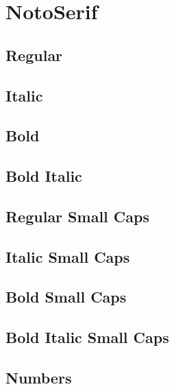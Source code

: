 \documentclass{article}
\begin{document}
\section*{NotoSerif}


\subsection*{Regular}
\lipsum[1]

\subsection*{Italic}
\textit{\lipsum[2]}

\subsection*{Bold}

\textbf{\lipsum[3]}



\subsection*{Bold Italic}

\textbf{\textit{\lipsum[4]}}

\subsection*{Regular Small Caps}
\textsc{\lipsum[1]}

\subsection*{Italic Small Caps}
\textsc{\textit{\lipsum[2]}}

\subsection*{Bold Small Caps}

\textsc{\textbf{\lipsum[3]}}



\subsection*{Bold Italic Small Caps}
\textsc{\textbf{\textit{\lipsum[4]}}}

\subsection*{Numbers}
\end{document}
